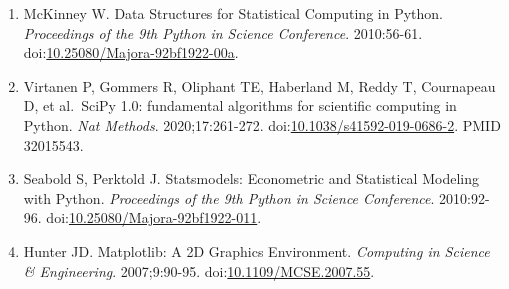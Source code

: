 \documentclass{article}
\begin{document}
\begin{enumerate}
  Harris CR, Millman KJ, van der Walt SJ, Gommers R, Virtanen P,
  Cournapeau D, et al.~Array programming with NumPy. \emph{Nature}.
  2020;585:357-362.
  doi:\href{https://doi.org/10.1038/s41586-020-2649-2}{10.1038/s41586-020-2649-2}.
  PMID 32939066.
\item
  McKinney W. Data Structures for Statistical Computing in Python.
  \emph{Proceedings of the 9th Python in Science Conference}.
  2010:56-61.
  doi:\href{https://doi.org/10.25080/Majora-92bf1922-00a}{10.25080/Majora-92bf1922-00a}.
\item
  Virtanen P, Gommers R, Oliphant TE, Haberland M, Reddy T, Cournapeau
  D, et al.~SciPy 1.0: fundamental algorithms for scientific computing
  in Python. \emph{Nat Methods}. 2020;17:261-272.
  doi:\href{https://doi.org/10.1038/s41592-019-0686-2}{10.1038/s41592-019-0686-2}.
  PMID 32015543.
\item
  Seabold S, Perktold J. Statsmodels: Econometric and Statistical
  Modeling with Python. \emph{Proceedings of the 9th Python in Science
  Conference}. 2010:92-96.
  doi:\href{https://doi.org/10.25080/Majora-92bf1922-011}{10.25080/Majora-92bf1922-011}.
\item
  Hunter JD. Matplotlib: A 2D Graphics Environment. \emph{Computing in
  Science \& Engineering}. 2007;9:90-95.
  doi:\href{https://doi.org/10.1109/MCSE.2007.55}{10.1109/MCSE.2007.55}.
\end{enumerate}
\end{document}
